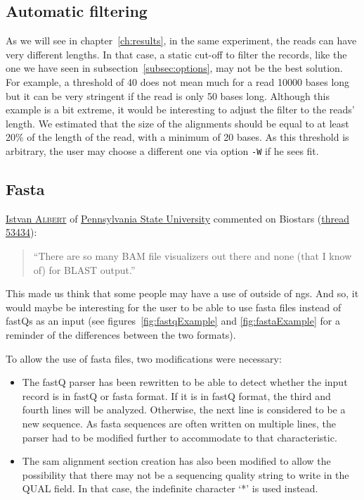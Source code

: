 \subsection{Automatic filtering}
\label{subsec:autofilter}
As we will see in chapter~\ref{ch:results}, in the same experiment, the reads can have very different lengths.
In that case, a static cut-off to filter the records, like the one we have seen in subsection~\ref{subsec:options}, may not be the best solution.
For example, a threshold of 40 does not mean much for a read 10000 bases long but it can be very stringent if the read is only 50 bases long.
Although this example is a bit extreme, it would be interesting to adjust the filter to the reads' length.
We estimated that the size of the alignments should be equal to at least 20\% of the length of the read, with a minimum of 20 bases.
As this threshold is arbitrary, the user may choose a different one via option \texttt{-W} if he sees fit.


\subsection{Fasta}
\href{http://www.personal.psu.edu/iua1/}{Istvan \textsc{Albert}} of \href{http://www.psu.edu/}{Pennsylvania State University} commented on Biostars (\href{https://www.biostars.org/p/53434/}{thread 53434}):
\begin{quote}
``There are so many BAM file visualizers out there and none (that I know of) for BLAST output.''
\end{quote}
This made us think that some people may have a use of \blastobam{} outside of \gls{ngs}.
And so, it would maybe be interesting for the user to be able to use fasta files instead of fastQs as an input
(see figures~\ref{fig:fastqExample} and \ref{fig:fastaExample} for a reminder of the differences between the two formats).

To allow the use of fasta files, two modifications were necessary:
\begin{itemize}
    \item The fastQ parser has been rewritten to be able to detect whether the input record is in fastQ or fasta format.
    If it is in fastQ format, the third and fourth lines will be analyzed. Otherwise, the next line is considered to be a new sequence.
    As fasta sequences are often written on multiple lines, the parser had to be modified further to accommodate to that characteristic.
    \item The \gls{sam} alignment section creation has also been modified to allow the possibility that there may not be a sequencing quality string to write in the QUAL field.
    In that case, the indefinite character `*' is used instead.
\end{itemize}
